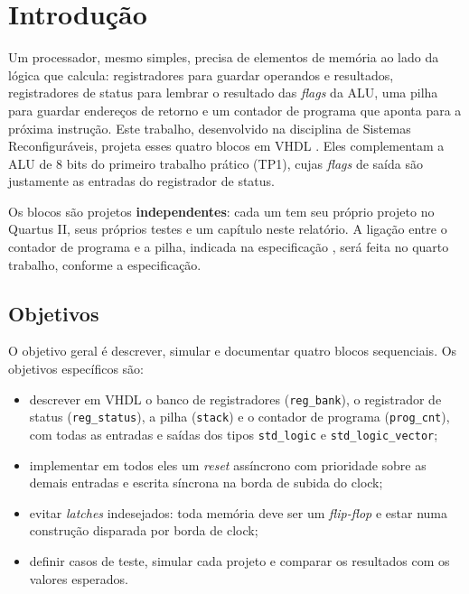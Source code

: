 \chapter{Introdução}
\label{cap:introducao}

Um processador, mesmo simples, precisa de elementos de memória ao lado da lógica que calcula: registradores para guardar operandos e resultados, registradores de status para lembrar o resultado das \textit{flags} da ALU, uma pilha para guardar endereços de retorno e um contador de programa que aponta para a próxima instrução. Este trabalho, desenvolvido na disciplina de Sistemas Reconfiguráveis, projeta esses quatro blocos em VHDL \cite{ashenden2008,pedroni2010}. Eles complementam a ALU de 8 bits do primeiro trabalho prático (TP1), cujas \textit{flags} de saída são justamente as entradas do registrador de status.

Os blocos são projetos \textbf{independentes}: cada um tem seu próprio projeto no Quartus II, seus próprios testes e um capítulo neste relatório. A ligação entre o contador de programa e a pilha, indicada na especificação \cite{tp2}, será feita no quarto trabalho, conforme a especificação.

\section{Objetivos}

O objetivo geral é descrever, simular e documentar quatro blocos sequenciais. Os objetivos específicos são:

\begin{itemize}
  \item descrever em VHDL o banco de registradores (\texttt{reg\_bank}), o registrador de status (\texttt{reg\_status}), a pilha (\texttt{stack}) e o contador de programa (\texttt{prog\_cnt}), com todas as entradas e saídas dos tipos \texttt{std\_logic} e \texttt{std\_logic\_vector};
  \item implementar em todos eles um \textit{reset} assíncrono com prioridade sobre as demais entradas e escrita síncrona na borda de subida do clock;
  \item evitar \textit{latches} indesejados: toda memória deve ser um \textit{flip-flop} e estar numa construção disparada por borda de clock;
  \item definir casos de teste, simular cada projeto e comparar os resultados com os valores esperados.
\end{itemize}

